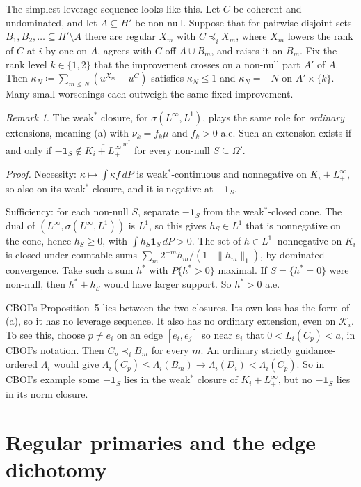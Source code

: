 \documentclass[11pt]{article}
\theoremstyle{remark}\newtheorem{remark}[theorem]{Remark}
\newcommand{\Kscr}{\mathcal K}
\newcommand{\one}{\mathbf 1}
\begin{document}
The simplest leverage sequence looks like this. Let $C$ be coherent and
undominated, and let $A\subseteq H'$ be non-null. Suppose that for pairwise
disjoint sets $B_1,B_2,\ldots\subseteq H'\setminus A$ there are regular $X_m$
with $C\preceq_iX_m$, where $X_m$ lowers the rank of $C$ at $i$ by one on $A$,
agrees with $C$ off $A\cup B_m$, and raises it on $B_m$. Fix the rank level
$k\in\{1,2\}$ that the improvement crosses on a non-null part $A'$ of $A$.
Then $\kappa_N\coloneqq\sum_{m\le N}(u^{X_m}-u^C)$ satisfies $\kappa_N\le1$
and $\kappa_N=-N$ on $A'\times\{k\}$. Many small worsenings each outweigh the
same fixed improvement.

\begin{remark}\label{rem:weak-star}
The weak$^*$ closure, for $\sigma(L^\infty,L^1)$, plays the same role for
\emph{ordinary} extensions, meaning (a) with $\nu_k=f_k\mu$ and $f_k>0$ a.e.
Such an extension exists if and only if
$-\one_S\notin\overline{K_i+L^\infty_+}^{\,w^*}$ for every non-null
$S\subseteq\Omega'$.

\emph{Proof.} Necessity: $\kappa\mapsto\int\kappa f\,dP$ is
weak$^*$-continuous and nonnegative on $K_i+L^\infty_+$, so also on its
weak$^*$ closure, and it is negative at $-\one_S$.

Sufficiency: for each non-null $S$, separate $-\one_S$ from the weak$^*$-closed
cone. The dual of $(L^\infty,\sigma(L^\infty,L^1))$ is $L^1$, so this gives
$h_S\in L^1$ that is nonnegative on the cone, hence $h_S\ge0$, with
$\int h_S\one_S\,dP>0$. The set of $h\in L^1_+$ nonnegative on $K_i$ is
closed under countable sums $\sum_m2^{-m}h_m/(1+\|h_m\|_1)$, by dominated
convergence. Take such a sum $h^*$ with $P\{h^*>0\}$ maximal. If
$S=\{h^*=0\}$ were non-null, then $h^*+h_S$ would have larger support. So
$h^*>0$ a.e.
\end{remark}

CBOI's Proposition~5 lies between the two closures. Its own loss has the
form of (a), so it has no leverage sequence. It also has no ordinary
extension, even on $\Kscr_i$. To see this, choose $p\ne e_i$ on an edge
$[e_i,e_j]$ so near $e_i$ that $0<L_i(C_p)<a$, in CBOI's notation. Then
$C_p\prec_iB_m$ for every $m$. An ordinary strictly guidance-ordered
$\Lambda_i$ would give
$\Lambda_i(C_p)\le\Lambda_i(B_m)\to\Lambda_i(D_i)<\Lambda_i(C_p)$.
So in CBOI's example some $-\one_S$ lies in the weak$^*$ closure of
$K_i+L^\infty_+$, but no $-\one_S$ lies in its norm closure.

\section{Regular primaries and the edge dichotomy}
\end{document}
